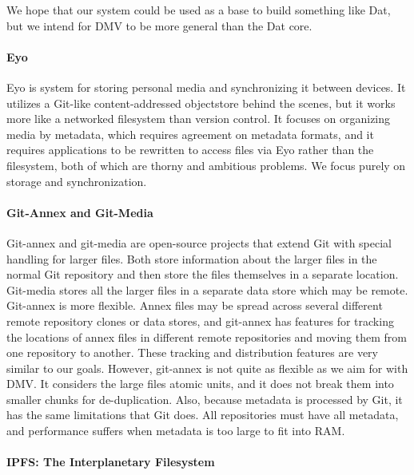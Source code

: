 We hope that our system could be used as a base to build something like Dat, but
we intend for \gls{DMV} to be more general than the Dat core.


\paragraph{Eyo}

Eyo \cite{Strauss:2011:EDP:2002181.2002216} is system for storing personal media
and synchronizing it between devices. It utilizes a Git-like content-addressed
\gls{objectstore} behind the scenes, but it works more like a networked filesystem
than version control. It focuses on organizing media by metadata, which requires
agreement on metadata formats, and it requires applications to be rewritten to
access files via Eyo rather than the filesystem, both of which are thorny and
ambitious problems. We focus purely on storage and synchronization.


\paragraph{Git-Annex and Git-Media}

Git-annex \cite{git_annex_homepage} and git-media \cite{git_media_github} are
open-source projects that extend Git with special handling for larger files.
Both store information about the larger files in the normal Git repository and
then store the files themselves in a separate location. Git-media stores all the
larger files in a separate data store which may be remote. Git-annex is more
flexible. Annex files may be spread across several different remote repository
clones or data stores, and git-annex has features for tracking the locations of
annex files in different remote repositories and moving them from one repository
to another. These tracking and distribution features are very similar to our
goals. However, git-annex is not quite as flexible as we aim for with \gls{DMV}.
It considers the large files atomic units, and it does not break them into
smaller chunks for de-duplication. Also, because metadata is processed by Git,
it has the same limitations that Git does. All repositories must have all
metadata, and performance suffers when metadata is too large to fit into RAM.


\paragraph{IPFS: The Interplanetary Filesystem}

